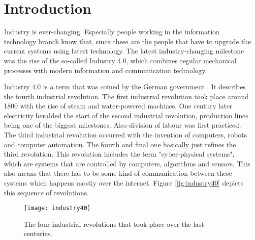 \chapter{Introduction}
\label{ch:Introduction}




Industry is ever-changing. Especially people working in the information technology branch know that, since these are the people that have to upgrade the current systems using latest technology. The latest industry-changing milestone was the rise of the so-called Industry 4.0, which combines regular mechanical processes with modern information and communication technology.

Industry 4.0 is a term that was coined by the German government \cite{Industrie4.0Paper}. It describes the fourth industrial revolution. The first industrial revolution took place around 1800 with the rise of steam and water-powered machines. One century later electricity heralded the start of the second industrial revolution, production lines being one of the biggest milestones. Also division of labour was first practiced. The third industrial revolution occurred with the invention of computers, robots and computer automation. The fourth and final one basically just refines the third revolution. This revolution includes the term "cyber-physical systems", which are systems that are controlled by computers, algorithms and sensors. This also means that there has to be some kind of communication between these systems which happens mostly over the internet. Figure \vref{fig:industry40} depicts this sequence of revolutions.


\begin{figure}[H]
    \centering
    \texttt{[image: industry40]}
    \caption{The four industrial revolutions that took place over the last centuries. \cite{img:industry4.0}}
    \label{fig:industry40}
\end{figure}

